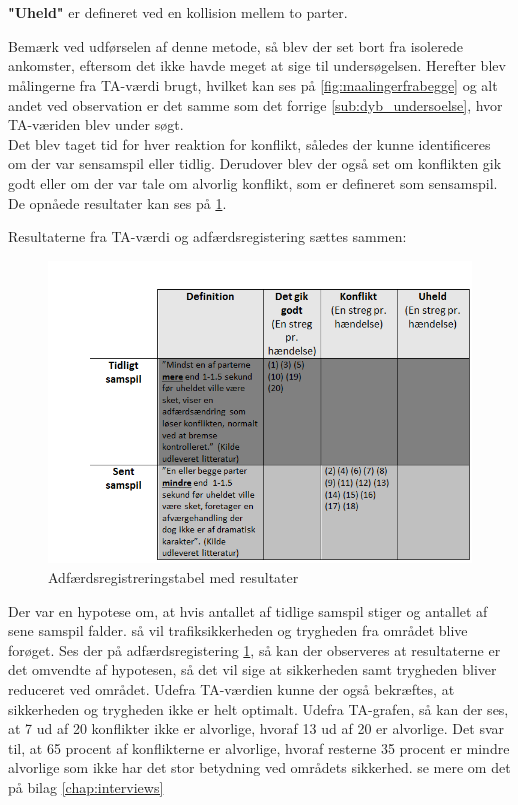 \\\\
\textbf{"Uheld"} er	defineret	ved	en	kollision	mellem	to	parter.

Bemærk ved udførselen af denne metode, så blev der set bort fra isolerede ankomster, eftersom det ikke havde meget at sige til undersøgelsen. Herefter blev målingerne fra TA-værdi brugt, hvilket kan ses på \cref{fig:maalingerfrabegge} og alt andet ved observation er det samme som det forrige \cref{sub:dyb_undersoelse}, hvor TA-væriden blev under søgt.
\\
Det blev taget tid for hver reaktion for konflikt, således der kunne identificeres om der var sensamspil eller tidlig. Derudover blev der også set om konflikten gik godt eller om der var tale om alvorlig konflikt, som er defineret som sensamspil. De opnåede resultater kan ses på \cref{fig:adfregtabelresult}.


Resultaterne fra TA-værdi og adfærdsregistering sættes sammen:
\begin{figure}[htbp]
  \label{fig:adfregtabelresult}
  \centering
  \begin{adjustbox}{max width=\textwidth}
    \includegraphics{billederogfigur/obstabelresult.png} %
 \end{adjustbox}
  \caption{Adfærdsregistreringstabel med resultater}
\end{figure}

Der var en hypotese om, at hvis antallet af tidlige samspil stiger og antallet af sene samspil falder. så vil trafiksikkerheden og trygheden fra området blive forøget. Ses der på adfærdsregistering \cref{fig:adfregtabelresult}, så kan der observeres at resultaterne er det omvendte af hypotesen, så det vil sige at sikkerheden samt trygheden bliver reduceret ved området. Udefra TA-værdien kunne der også bekræftes, at sikkerheden og trygheden ikke er helt optimalt.
Udefra TA-grafen, så kan der ses, at 7 ud af 20 konflikter ikke er alvorlige, hvoraf 13 ud af 20 er alvorlige. Det svar til, at 65 procent af konflikterne er alvorlige, hvoraf resterne 35 procent er mindre alvorlige som ikke har det stor betydning ved områdets sikkerhed.
se mere om det på bilag \cref{chap:interviews}
